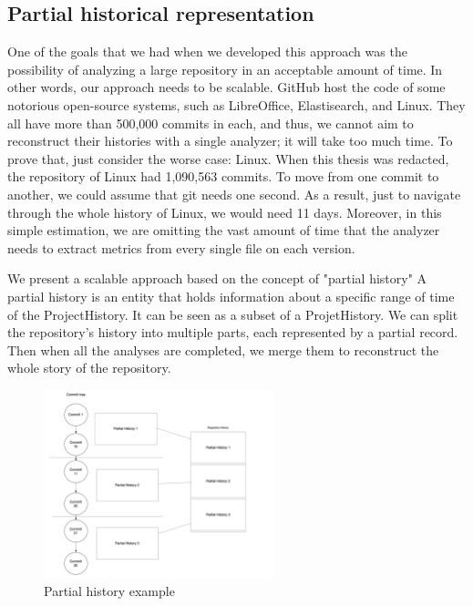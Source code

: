 \label{s:partialHistoricalRepr}
\subsection*{Partial historical representation}
One of the goals that we had when we developed this approach was the possibility of analyzing a large repository in an acceptable amount of time. 
In other words, our approach needs to be scalable.
GitHub host the code of some notorious open-source systems, such as LibreOffice, Elastisearch, and Linux.
They all have more than 500,000 commits in each, and thus, we cannot aim to reconstruct their histories with a single analyzer; it will take too much time.  
To prove that, just consider the worse case: Linux. 
When this thesis was redacted, the repository of Linux had 1,090,563 commits. 
To move from one commit to another, we could assume that git needs one second. 
As a result, just to navigate through the whole history of Linux, we would need 11 days.
Moreover, in this simple estimation, we are omitting the vast amount of time that the analyzer needs to extract metrics from every single file on each version. 

We present a scalable approach based on the concept of "partial history" 
A partial history is an entity that holds information about a specific range of time of the ProjectHistory. 
It can be seen as a subset of a ProjetHistory. 
We can split the repository's history into multiple parts, each represented by a partial record. Then when all the analyses are completed, we merge them to reconstruct the whole story of the repository.


\begin{figure}
    \includegraphics[width=0.6\textwidth]{PartialHistory.png}
    \caption{Partial history example}
    \label{fig:PartialHistory}
\end{figure}

